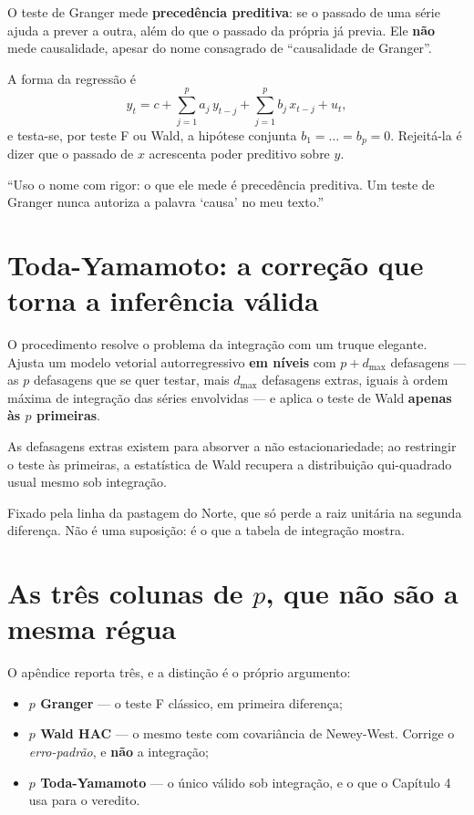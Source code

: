 O teste de Granger mede \textbf{precedência preditiva}: se o passado de uma
série ajuda a prever a outra, além do que o passado da própria já previa. Ele
\textbf{não} mede causalidade, apesar do nome consagrado de ``causalidade de
Granger''.

A forma da regressão é
\begin{equation}
y_t = c + \sum_{j=1}^{p} a_j\, y_{t-j} + \sum_{j=1}^{p} b_j\, x_{t-j} + u_t,
\end{equation}
e testa-se, por teste F ou Wald, a hipótese conjunta $b_1 = \dots = b_p = 0$.
Rejeitá-la é dizer que o passado de $x$ acrescenta poder preditivo sobre $y$.

\begin{nabanca}
``Uso o nome com rigor: o que ele mede é precedência preditiva. Um teste de
Granger nunca autoriza a palavra `causa' no meu texto.''
\end{nabanca}

\section{Toda-Yamamoto: a correção que torna a inferência válida}

O procedimento resolve o problema da integração com um truque elegante. Ajusta
um modelo vetorial autorregressivo \textbf{em níveis} com $p + d_{\max}$
defasagens --- as $p$ defasagens que se quer testar, mais $d_{\max}$ defasagens
extras, iguais à ordem máxima de integração das séries envolvidas --- e aplica
o teste de Wald \textbf{apenas às $p$ primeiras}.

As defasagens extras existem para absorver a não estacionariedade; ao restringir
o teste às primeiras, a estatística de Wald recupera a distribuição
qui-quadrado usual mesmo sob integração.

\begin{ancora}[Aqui, $d_{\max} = 2$]
Fixado pela linha da pastagem do Norte, que só perde a raiz unitária na segunda
diferença. Não é uma suposição: é o que a tabela de integração mostra.
\end{ancora}

\section{As três colunas de $p$, que não são a mesma régua}

O apêndice reporta três, e a distinção é o próprio argumento:

\begin{itemize}
\item \textbf{$p$ Granger} --- o teste F clássico, em primeira diferença;
\item \textbf{$p$ Wald HAC} --- o mesmo teste com covariância de Newey-West.
Corrige o \emph{erro-padrão}, e \textbf{não} a integração;
\item \textbf{$p$ Toda-Yamamoto} --- o único válido sob integração, e o que o
Capítulo 4 usa para o veredito.
\end{itemize}

